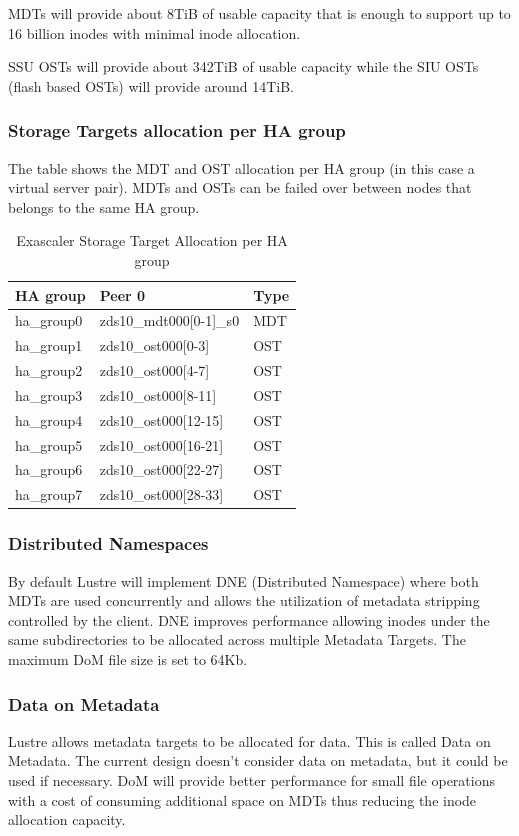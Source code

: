 \documentclass{article}
\begin{document}
MDTs will provide about 8TiB of usable capacity that is enough to support up to 16 billion inodes with minimal inode allocation. 

SSU OSTs will provide about 342TiB of usable capacity while the SIU OSTs (flash based OSTs) will provide around 14TiB. 

\subsubsection{Storage Targets allocation per HA group}
The table shows the MDT and OST allocation per HA group (in this case a virtual server pair). MDTs and OSTs can be failed over between nodes that belongs to the same HA group. 

\begin{table}[htbp]
\centering
\begin{tabular}{|l|l|l|}
    \hline
    \textbf{HA group} & \textbf{Peer 0} &  \textbf{Type}\\
    \hline
    ha\_group0 & zds10\_mdt000[0-1]\_s0 & MDT \\
    ha\_group1 & zds10\_ost000[0-3] & OST \\
    ha\_group2 & zds10\_ost000[4-7] & OST \\
    ha\_group3 & zds10\_ost000[8-11] & OST \\
    ha\_group4 & zds10\_ost000[12-15] & OST \\
    ha\_group5 & zds10\_ost000[16-21] & OST \\
    ha\_group6 & zds10\_ost000[22-27] & OST \\
    ha\_group7 & zds10\_ost000[28-33] & OST \\
    \hline
\end{tabular}
\caption{Exascaler Storage Target Allocation per HA group}
\label{tab:es-storage-alloc-hagroup}
\end{table}


\subsubsection{Distributed Namespaces}
By default Lustre will implement DNE (Distributed Namespace) where both MDTs are used concurrently and allows the utilization of metadata stripping controlled by the client. DNE improves performance allowing inodes under the same subdirectories to be allocated across multiple Metadata Targets. The maximum DoM file size is set to 64Kb. 

\subsubsection{Data on Metadata}
Lustre allows metadata targets to be allocated for data. This is called Data on Metadata. The current design doesn't consider data on metadata, but it could be used if necessary. DoM will provide better performance for small file operations with a cost of consuming additional space on MDTs thus reducing the inode allocation capacity. 
\end{document}

